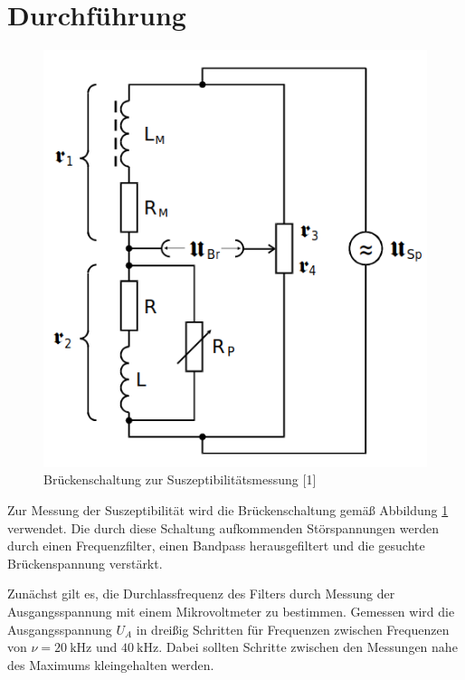 \section{Durchführung}
\label{sec:Durchführung}

\begin{figure} [H]
    \centering
    \includegraphics[scale=0.5]{content/bild1.png}
    \caption{Brückenschaltung zur Suszeptibilitätsmessung [1]}
    \label{fig:plot1}
  \end{figure}

Zur Messung der Suszeptibilität wird die Brückenschaltung
gemäß Abbildung \ref{fig:plot1} verwendet. Die durch diese Schaltung
aufkommenden Störspannungen werden durch einen Frequenzfilter,
einen Bandpass herausgefiltert und die gesuchte
Brückenspannung verstärkt.

Zunächst gilt es,
die Durchlassfrequenz des Filters durch Messung der
Ausgangsspannung mit einem Mikrovoltmeter zu bestimmen.
Gemessen wird die Ausgangsspannung $U_A$ in dreißig Schritten
für Frequenzen zwischen Frequenzen von $\nu = \SI{20}{\kilo\hertz}$ und
$\SI{40}{\kilo\hertz}$. Dabei sollten Schritte zwischen den Messungen
nahe des Maximums kleingehalten werden.

